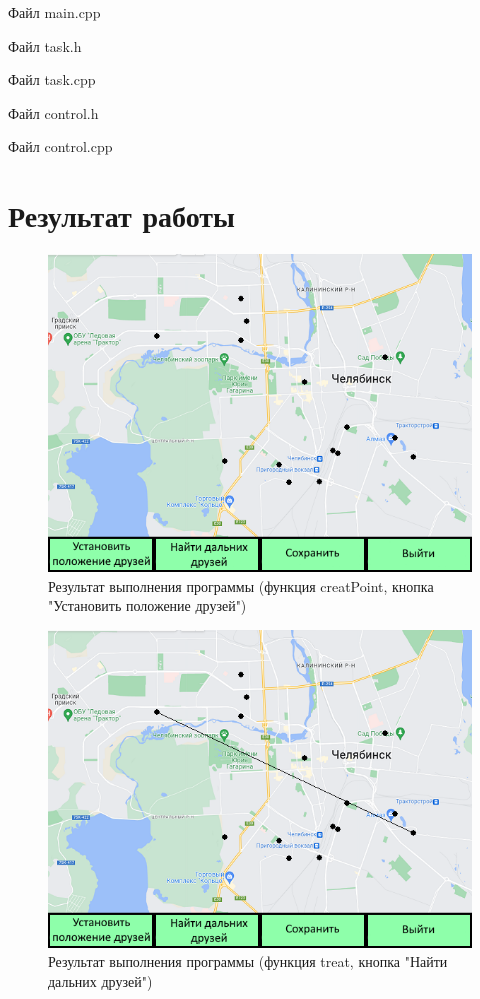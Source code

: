 \documentclass[14pt, a4paper]{extreport}
\begin{document}
\noindent Файл main.cpp

\pagebreak
\hrulefill

\noindent Файл task.h

\hrulefill

\noindent Файл task.cpp

\hrulefill

\noindent Файл control.h

\hrulefill

\noindent Файл control.cpp


\chapter{Результат работы}

\begin{figure}[h!]
	\centering
	\includegraphics[width = 12cm]{image/image_1}
  \caption{Результат выполнения программы (функция creatPoint, кнопка "Установить положение друзей")}
\end{figure}

\begin{figure}[h!]
	\centering
	\includegraphics[width = 12cm]{image/image_2}
  \caption{Результат выполнения программы (функция treat, кнопка "Найти дальних друзей")}
\end{figure}

\end{document}
